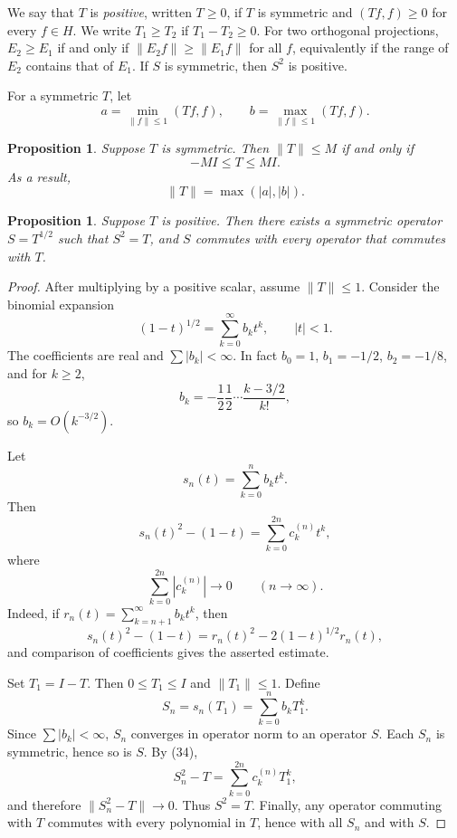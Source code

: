\documentclass[11pt,openany]{book}
\newtheorem{proposition}[theorem]{Proposition}
\begin{document}
We say that $T$ is \emph{positive}, written $T\geq0$, if $T$ is symmetric and $(Tf,f)\geq0$ for every $f\in H$. We write $T_1\geq T_2$ if $T_1-T_2\geq0$. For two orthogonal projections, $E_2\geq E_1$ if and only if $\|E_2f\|\geq\|E_1f\|$ for all $f$, equivalently if the range of $E_2$ contains that of $E_1$. If $S$ is symmetric, then $S^2$ is positive.

For a symmetric $T$, let
\begin{equation}
a=\min_{\|f\|\leq1}(Tf,f),
\qquad
b=\max_{\|f\|\leq1}(Tf,f).
\tag{33}
\end{equation}

\begin{proposition}
Suppose $T$ is symmetric. Then $\|T\|\leq M$ if and only if
\[
-MI\leq T\leq MI.
\]
As a result,
\[
\|T\|=\max(|a|,|b|).
\]
\end{proposition}

\begin{proposition}
Suppose $T$ is positive. Then there exists a symmetric operator $S=T^{1/2}$ such that $S^2=T$, and $S$ commutes with every operator that commutes with $T$.
\end{proposition}

\begin{proof}
After multiplying by a positive scalar, assume $\|T\|\leq1$. Consider the binomial expansion
\[
(1-t)^{1/2}=\sum_{k=0}^{\infty}b_kt^k,
\qquad |t|<1.
\]
The coefficients are real and $\sum|b_k|<\infty$. In fact $b_0=1$, $b_1=-1/2$, $b_2=-1/8$, and for $k\geq2$,
\[
b_k=-\frac{1}{2}\frac{1}{2}\cdots\frac{k-3/2}{k!},
\]
so $b_k=O(k^{-3/2})$.

Let
\[
s_n(t)=\sum_{k=0}^{n}b_kt^k.
\]
Then
\begin{equation}
s_n(t)^2-(1-t)=\sum_{k=0}^{2n}c_k^{(n)}t^k,
\tag{34}
\end{equation}
where
\[
\sum_{k=0}^{2n}|c_k^{(n)}|\to0
\qquad(n\to\infty).
\]
Indeed, if $r_n(t)=\sum_{k=n+1}^{\infty}b_kt^k$, then
\[
s_n(t)^2-(1-t)=r_n(t)^2-2(1-t)^{1/2}r_n(t),
\]
and comparison of coefficients gives the asserted estimate.

Set $T_1=I-T$. Then $0\leq T_1\leq I$ and $\|T_1\|\leq1$. Define
\[
S_n=s_n(T_1)=\sum_{k=0}^{n}b_kT_1^k.
\]
Since $\sum|b_k|<\infty$, $S_n$ converges in operator norm to an operator $S$. Each $S_n$ is symmetric, hence so is $S$. By (34),
\[
S_n^2-T=\sum_{k=0}^{2n}c_k^{(n)}T_1^k,
\]
and therefore $\|S_n^2-T\|\to0$. Thus $S^2=T$. Finally, any operator commuting with $T$ commutes with every polynomial in $T$, hence with all $S_n$ and with $S$.
\end{proof}
\end{document}
